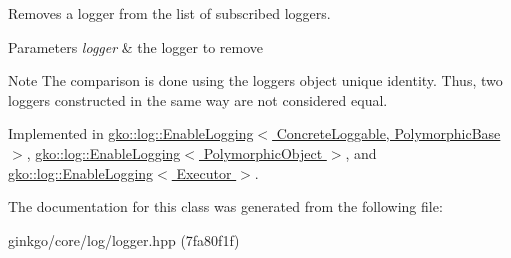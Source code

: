 Removes a logger from the list of subscribed loggers. 


\begin{DoxyParams}{Parameters}
{\em logger} & the logger to remove\\
\hline
\end{DoxyParams}
\begin{DoxyNote}{Note}
The comparison is done using the logger\textquotesingle{}s object unique identity. Thus, two loggers constructed in the same way are not considered equal. 
\end{DoxyNote}


Implemented in \hyperlink{classgko_1_1log_1_1EnableLogging_aba5317f8a03956a61d770e9b07fc65cc}{gko\+::log\+::\+Enable\+Logging$<$ Concrete\+Loggable, Polymorphic\+Base $>$}, \hyperlink{classgko_1_1log_1_1EnableLogging_aba5317f8a03956a61d770e9b07fc65cc}{gko\+::log\+::\+Enable\+Logging$<$ Polymorphic\+Object $>$}, and \hyperlink{classgko_1_1log_1_1EnableLogging_aba5317f8a03956a61d770e9b07fc65cc}{gko\+::log\+::\+Enable\+Logging$<$ Executor $>$}.



The documentation for this class was generated from the following file\+:\begin{DoxyCompactItemize}
\item 
ginkgo/core/log/logger.\+hpp (7fa80f1f)\end{DoxyCompactItemize}
